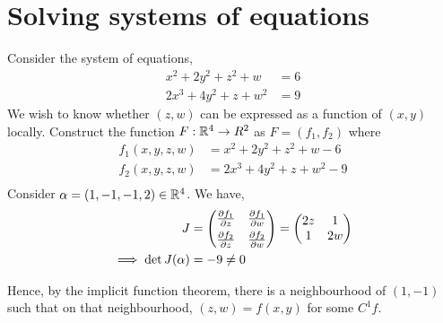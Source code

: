 \documentclass[../Analysis-3.tex]{subfiles}
\begin{document}
\pagebreak

\section{Solving systems of equations}
\begin{Eg}{}{}
  Consider the system of equations,
  \begin{align*}
    x^2 + 2y^2 + z^2 + w  & = 6 \\
    2x^3 + 4y^2 + z + w^2 & = 9
  \end{align*}
  We wish to know whether \( (z,w) \) can be expressed as a function of \( (x,y) \) locally. Construct the function \( F: \mathbb{R}^4 \to R^2 \) as \( F = (f_1, f_2) \) where
  \begin{align*}
    f_1(x,y,z,w) & = x^2 + 2y^2 + z^2 + w - 6  \\
    f_2(x,y,z,w) & = 2x^3 + 4y^2 + z + w^2 - 9 \\
  \end{align*}
  Consider \( \alpha = (1,-1, -1, 2) \in \mathbb{R}^4 \). We have,
  \begin{align*}
    J                       & =
    \begin{pmatrix}
      \pdv{f_1}{z} & \pdv{f_1}{w} \\[4pt]
      \pdv{f_2}{z} & \pdv{f_2}{w}
    \end{pmatrix}
    =
    \begin{pmatrix}
      2z & 1  \\
      1  & 2w
    \end{pmatrix}                        \\
    \implies \det J(\alpha) & = -9 \neq 0
  \end{align*}

  Hence, by the implicit function theorem, there is a neighbourhood of \( (1,-1) \) such that on that neighbourhood, \( (z,w) = f(x,y) \) for some \( C^1 f \).

\end{Eg}
\end{document}
